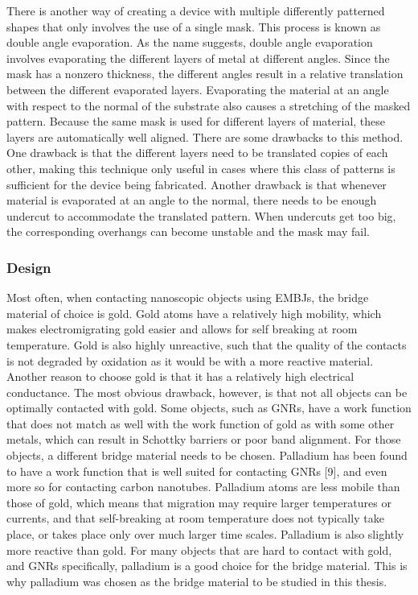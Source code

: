 There is another way of creating a device with multiple differently patterned shapes that only involves the use of a single mask. This process is known as double angle evaporation. As the name suggests, double angle evaporation involves evaporating the different layers of metal at different angles. Since the mask has a nonzero thickness, the different angles result in a relative translation between the different evaporated layers. Evaporating the material at an angle with respect to the normal of the substrate also causes a stretching of the masked pattern. Because the same mask is used for different layers of material, these layers are automatically well aligned. There are some drawbacks to this method. One drawback is that the different layers need to be translated copies of each other, making this technique only useful in cases where this class of patterns is sufficient for the device being fabricated. Another drawback is that whenever material is evaporated at an angle to the normal, there needs to be enough undercut to accommodate the translated pattern. When undercuts get too big, the corresponding overhangs can become unstable and the mask may fail. 

\subsubsection{Design}

Most often, when contacting nanoscopic objects using EMBJs, the bridge material of choice is gold. Gold atoms have a relatively high mobility, which makes electromigrating gold easier and allows for self breaking at room temperature. Gold is also highly unreactive, such that the quality of the contacts is not degraded by oxidation as it would be with a more reactive material. Another reason to choose gold is that it has a relatively high electrical conductance. The most obvious drawback, however, is that not all objects can be optimally contacted with gold. Some objects, such as GNRs, have a work function that does not match as well with the work function of gold as with some other metals, which can result in Schottky barriers or poor band alignment. For those objects, a different bridge material needs to be chosen. Palladium has been found to have a work function that is well suited for contacting GNRs [9], and even more so for contacting carbon nanotubes. Palladium atoms are less mobile than those of gold, which means that migration may require larger temperatures or currents, and that self-breaking at room temperature does not typically take place, or takes place only over much larger time scales. Palladium is also slightly more reactive than gold. For many objects that are hard to contact with gold, and GNRs specifically, palladium is a good choice for the bridge material. This is why palladium was chosen as the bridge material to be studied in this thesis.\\


